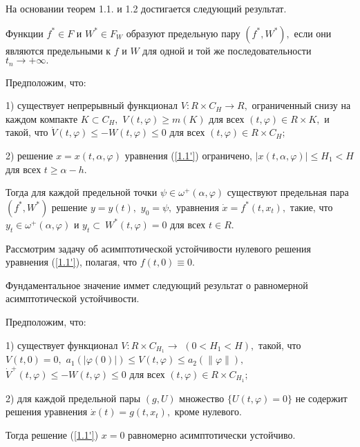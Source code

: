 На основании теорем 1.1. и 1.2 достигается следующий результат.

\begin{definition}\label{d-4.1}  Функции $f^* \in F$ и $W^*\in F_W$ образуют
	предельную пару $(f^*,W^*),$ если они являются предельными  к $f$ и
	$W$ для  одной  и  той  же  последовательности $t_n\to +\infty .$
\end{definition}

\begin{theorem}\label{t-1.3} Предположим, что:
	
	1) существует непрерывный функционал $V : R \times C_H\to R,$  ограниченный
	снизу на каждом компакте $K\subset C_H,$ $V(t,\varphi )\ge m(K)$
	для всех $(t,\varphi )\in R \times K,$ и такой, что $\dot
	V(t,\varphi )\le -W(t,\varphi )\le 0$  для  всех $(t,\varphi )\in R
	\times C_H;$
	
	2) решение $x=x(t,\alpha ,\varphi )$ уравнения (\ref{1.1'})  ограничено,
	$|x(t,\alpha ,\varphi )|\le H_1<H$
	для всех $t\ge\alpha -h.$
	
	Тогда для каждой  предельной
	точки $\psi\in\omega ^+(\alpha ,\varphi )$  существуют  предельная
	пара  $(f^*, W^*)$ решение $y=y(t),$ $y_0=\psi, $ уравнения $\dot x=f^*(t,x_t),$  такие,  что
	$ y_t\in \omega ^+(\alpha ,\varphi )$ и
	$y_t\subset\ { W^*(t,\varphi )=0}$
		для всех  $t\in R.$
	\end{theorem}
	
	Рассмотрим задачу об асимптотической устойчивости нулевого
	решения уравнения (\ref{1.1'}), полагая, что $f(t,0)\equiv 0.$
	
	Фундаментальное значение иммет следующий  результат   о
	равномерной асимптотической устойчивости.
	
	\begin{theorem}\label{t-4.5} Предположим, что:
		
		1) существует функционал $V: R \times C_{H_1}\to $ $(0<H_1<H),$
		такой,  что $V(t,0)=0,$ $a_1(|\varphi (0)|)\le V(t,\varphi )\le a_2(\|\varphi \| ),$
		$\dot V^+(t,\varphi )\le -W(t,\varphi )\le 0$ для всех
		$(t,\varphi )\in R \times C_{H_1};$
		
		2) для  каждой  предельной пары $(g,U)$  множество $\{ U(t,\varphi )=0\}$  не
		содержит решения уравнения $\dot x(t)=g(t,x_t),$  кроме нулевого.
		
		
		Тогда решение (\ref{1.1'})  $x=0$ равномерно асимптотически устойчиво.
	\end{theorem}
	
